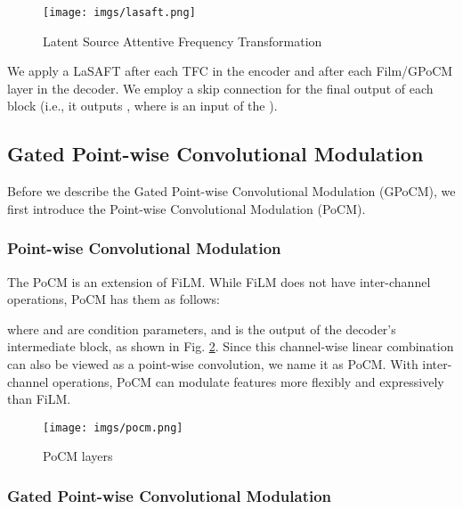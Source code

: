 \documentclass{article}
\begin{document}
\begin{figure}[htb]


  \centering
  {\texttt{[image: imgs/lasaft.png]}}

    \caption{Latent Source Attentive Frequency Transformation}
    \label{fig:lasaft}

\end{figure}

We apply a LaSAFT after each TFC in the encoder and after each Film/GPoCM layer in the decoder.
We employ a skip connection for the final output of each block (i.e., it  outputs , where  is an input of the ).

\subsection{Gated Point-wise Convolutional Modulation}
\label{sec:format}

Before we describe the Gated Point-wise Convolutional Modulation (GPoCM), we first introduce the Point-wise Convolutional Modulation (PoCM).

\subsubsection{Point-wise Convolutional Modulation}

The PoCM is an extension of FiLM. While FiLM does not have inter-channel operations, PoCM has them as follows:



\noindent
where  and  are condition parameters, and  is the output of the  decoder's intermediate block, as shown in Fig. \ref{fig:pocm}. Since this channel-wise linear combination can also be viewed as a point-wise convolution, we name it as PoCM. With inter-channel operations, PoCM can modulate features more flexibly and expressively than FiLM.

\begin{figure}[htb]

  \centering
  {\texttt{[image: imgs/pocm.png]}}

    \caption{PoCM layers}
    \label{fig:pocm}

\end{figure}

\subsubsection{Gated Point-wise Convolutional Modulation}
\end{document}
